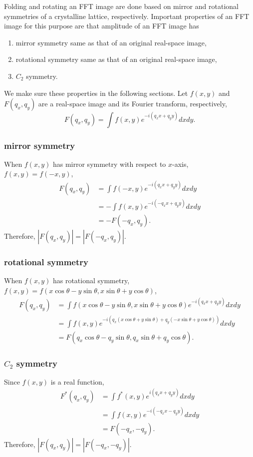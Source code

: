 \documentclass[a4paper]{article}
\begin{document}
Folding and rotating an FFT image are done based on mirror and rotational symmetries of a crystalline lattice, respectively.
Important properties of an FFT image for this purpose are that amplitude of an FFT image has
\begin{enumerate}
	\item mirror symmetry same as that of an original real-space image,
	\item rotational symmetry same as that of an original real-space image,
	\item $C_2$ symmetry.
\end{enumerate}
We make sure these properties in the following sections.
Let $f(x,y)$ and $F(q_x,q_y)$ are a real-space image and its Fourier transform, respectively,
\begin{equation}
	F(q_x,q_y) = \int f(x,y)e^{-i(q_xx+q_yy)}dxdy.
\end{equation}

\subsubsection*{mirror symmetry}
When $f(x,y)$ has mirror symmetry with respect to $x$-axis, $f(x,y)=f(-x,y)$,
\begin{align}
	F(q_x,q_y) &= \int f(-x,y)e^{-i(q_xx+q_yy)}dxdy\\
		&= -\int f(x,y)e^{-i(-q_xx+q_yy)}dxdy\\
		&= -F(-q_x,q_y).
\end{align}
Therefore, $|F(q_x,q_y)|=|F(-q_x,q_y)|$.

\subsubsection*{rotational symmetry}
When $f(x,y)$ has rotational symmetry, $f(x,y)=f(x\cos\theta-y\sin\theta,x\sin\theta+y\cos\theta)$,
\begin{align}
	F(q_x,q_y) &= \int f(x\cos\theta-y\sin\theta,x\sin\theta+y\cos\theta)e^{-i(q_xx+q_yy)}dxdy\\
		&= \int f(x,y)e^{-i(q_x(x\cos\theta+y\sin\theta)+q_y(-x\sin\theta+y\cos\theta))}dxdy\\
		&= F(q_x\cos\theta-q_y\sin\theta,q_x\sin\theta+q_y\cos\theta).
\end{align}

\subsubsection*{$C_2$ symmetry}
Since $f(x,y)$ is a real function,
\begin{align}
	F^*(q_x,q_y) &= \int f^*(x,y)e^{i(q_xx+q_yy)}dxdy\\
		&= \int f(x,y)e^{-i(-q_xx-q_yy)}dxdy\\
		&= F(-q_x,-q_y).
\end{align}
Therefore, $|F(q_x,q_y)|=|F(-q_x,-q_y)|$.
\end{document}
